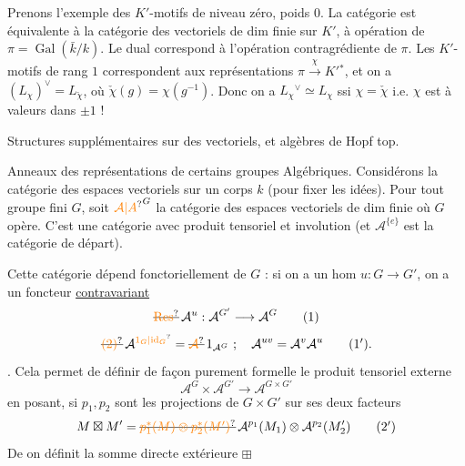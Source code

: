 Prenons l'exemple des $K'$-motifs de niveau zéro,
poids $0$. La catégorie est équivalente à la catégorie
des vectoriels de dim finie sur $K'$, 
 à opération  de $\pi=\operatorname{Gal}(\bar k/k)$. Le dual
correspond à l'opération contragrédiente de $\pi$. Les
$K'$-motifs de rang $1$  correspondent aux
représentations   $\pi\xrightarrow{\chi}K'{}^*$, et on a
$(L_\chi)^\vee=L_{\check\chi}$, où $\check\chi(g)=\chi(g^{-1})$. Donc
on a $L_\chi{}^\vee\simeq L_\chi$ ssi $\chi=\check\chi$ i.e. $\chi$ est
à valeurs dans $\pm1$ !

Structures supplémentaires sur des vectoriels, et algèbres de Hopf top.

Anneaux des représentations de certains groupes Algébriques.
Considérons la catégorie des espaces vectoriels  sur un corps $k$
(pour fixer les idées). Pour tout groupe fini $G$, soit
${\unsure{\mathcal A|A}}^G$ la catégorie des espaces vectoriels de dim finie où
$G$ opère. C'est  une catégorie avec produit
tensoriel  et involution  (et $\mathcal A^{\{e\}}$ est la catégorie de départ).


Cette catégorie dépend fonctoriellement de $G$ : si on a
un hom $u:G\longrightarrow G'$, on a un foncteur \uline{contravariant}
\[
\deleted{\unsure{\mathrm{Res}}}\,\mathcal A^u:\mathcal A^{G'}\longrightarrow\mathcal A^G \tag*{(1)}
\]
\[
\deleted{\unsure{(2)}}\,\mathcal A^{\unsure{1_G|\mathrm{id}_G}}=\deleted{\unsure{\mathcal A}}\,1_{\mathcal A^G}\ ;\quad \mathcal A^{uv}=\mathcal A^v\mathcal A^u \tag*{$(1')$.}
\]
. Cela permet de définir de façon purement
formelle le produit tensoriel externe
\[
\mathcal A^G\times\mathcal A^{G'}\longrightarrow\mathcal A^{G\times G'} \tag*{(2)}
\]
en posant, si $p_1,p_2$ sont les projections de $G\times G'$ sur ses
deux facteurs
\[
M\boxtimes M'=\deleted{\unsure{p_1^*(M)\otimes p_2^*(M')}}\,\mathcal A^{p_1}(M_1)\otimes\mathcal A^{p_2}(M'_2) \tag*{$(2')$}
\]
De  on définit la somme directe extérieure $\boxplus$

